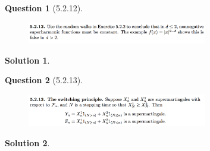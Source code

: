 \documentclass[11pt]{article}
\theoremstyle{plain}
\theoremstyle{quest}
\newtheorem*{question}{Question}
\newtheorem*{solution}{Solution}
\begin{document}
\newpage

\begin{question}[5.2.12]
\hfill
\begin{figure}[h!]
  \centering
    \includegraphics[width=0.7\textwidth]{d-5-2-12.png}
\end{figure}
\end{question}
\begin{solution} \hfill \\
\end{solution}

\newpage

\begin{question}[5.2.13]
\hfill
\begin{figure}[h!]
  \centering
    \includegraphics[width=0.7\textwidth]{d-5-2-13.png}
\end{figure}
\end{question}
\begin{solution} \hfill \\
\end{solution}
\end{document}

